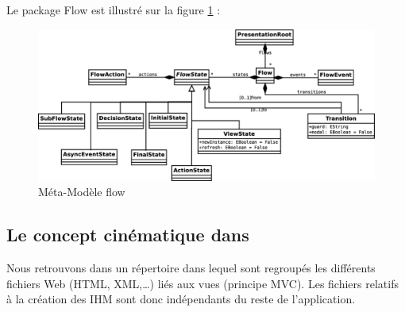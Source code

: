 \begin{itemize}
Le package Flow est illustré sur la figure \ref{fig:flow} :

\begin{figure}[H]
  \centering
  \includegraphics[scale=.3]{img/flow.eps}
  \caption{Méta-Modèle flow}
  \label{fig:flow}
\end{figure}

\end{itemize}


\subsection{Le concept cinématique dans \kwplay{}}
Nous retrouvons dans \kwplay{} un répertoire dans lequel sont regroupés les différents fichiers Web (HTML, XML,\dots) liés aux vues (principe MVC). Les fichiers relatifs à la création des \textsc{IHM} sont donc indépendants du reste de l'application.   

